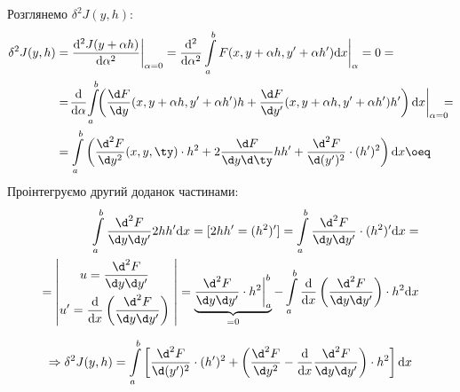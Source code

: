 
Розглянемо \( \delta^2 J(y, h): \)
\[
 \begin{split}
 \delta^2 J(y, h) &= \frac{\mathrm{d}^2 J(y + \alpha h)}{\mathrm{d} \alpha^2} \bigg|_{ \alpha = 0} = \frac{\mathrm{d}^2}{\mathrm{d} \alpha^2}   \int\limits_{a}^{b}{
 F(x,y + \alpha h, y' + \alpha h') \mathrm{d} x \bigg|_{\alpha} = 0 =
 } \\
 &= \! \frac{\mathrm{d}}{\mathrm{d} \alpha}\!
 \int\limits_{a}^{b}{\!\!
 \left(
\frac{\d F}{\d y} (x, y + \alpha h, y' + \alpha h') h + \frac{\d F}{\d y'} (x, y + \alpha h, y' + \alpha h')  h'
  \right) \mathrm{d} x \bigg|_{\alpha = 0}\!\!\!\!
 }= \\
 &=  \int\limits_{a}^{b}{
 \left(
\frac{\d^2 F}{\d y ^2 } (x, y, \ty) \cdot h^2 + 2 \frac{\d F}{\d y \d \ty} h h' + \frac{\d^2 F}{\d (y')^2} \cdot (h')^2
  \right) \mathrm{d} x
 } \oeq
 \end{split}
\]
Проінтегруємо другий доданок частинами:
\[
\begin{split}
\int\limits_{a}^{b}{
\frac{\d^2 F}{\d y \d y'} 2 h h' \mathrm{d} x
}  = [2hh' = (h^2)'] =  \int\limits_{a}^{b}{ \frac{\d^2 F}{\d y\d y'} \cdot (h^2)' \mathrm{d} x} = \\
= \left|
\begin{gathered}
u = \frac{\d^2 F}{\d y \d y'} \\
u' = \frac{\mathrm{d}}{\mathrm{d} x} \left(  \frac{\d^2 F}{\d y \d y'} \right)
\end{gathered} \
\begin{gathered}

\end{gathered}
 \right| = \underbrace{\frac{\d^2 F}{\d y \d y'} \cdot h^2 \bigg|_{a}^{b}}_{=0} -  \int\limits_{a}^{b}{
 \frac{\mathrm{d}}{\mathrm{d} x} \left( \frac{\d^2 F}{\d y \d y'} \right) \cdot h^2
 \mathrm{d} x}
\end{split}
\]

\[
  \Rightarrow \delta^2 J(y, h) =  \int\limits_{a}^{b}{
  \left[
\frac{\d^2 F}{\d (y')^2} \cdot (h')^2 + \left(
\frac{\d^2 F}{\d y^2} - \frac{\mathrm{d}}{\mathrm{d} x} \frac{\d^2 F}{\d y \d y'}
\right)\cdot  h^2
   \right] \mathrm{d} x
  }
\]


